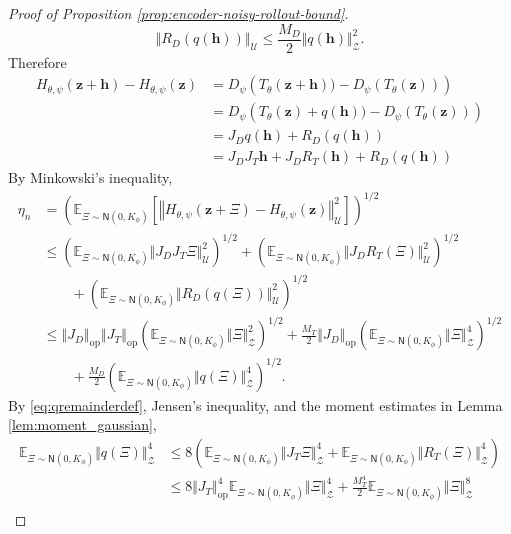 \documentclass[11pt]{article}
\newcommand{\bbE}{\mathbb{E}}
\begin{document}
\begin{proof}[Proof of Proposition \ref{prop:encoder-noisy-rollout-bound}]
\begin{equation*}
    \Vert R_D(q(\mathbf h))\Vert_\mathcal{U}\leq\frac{M_D}{2}\Vert q(\mathbf h)\Vert_\mathcal{Z}^2.
\end{equation*}
Therefore
\begin{equation*}
\begin{aligned}
    H_{\theta,\psi}(\mathbf{z}+\mathbf{h})-H_{\theta,\psi}(\mathbf z)&=D_\psi\left(T_\theta(\mathbf{z}+\mathbf h))-D_\psi(T_\theta(\mathbf z))\right)\\
    &=D_\psi\left(T_\theta(\mathbf z)+q(\mathbf{h}))-D_\psi(T_\theta(\mathbf z))\right)\\
    &=J_Dq(\mathbf h)+R_D(q(\mathbf h))\\
    &=J_DJ_T\mathbf{h}+J_DR_T(\mathbf{h})+R_D(q(\mathbf h))
\end{aligned}
\end{equation*}
By Minkowski's inequality,
\begin{align*}
    \eta_n&=\left(\bbE_{\Xi\sim\mathsf N(0,K_\phi)}\left[\left\Vert H_{\theta,\psi}(\mathbf z+\Xi)-H_{\theta,\psi}(\mathbf z)\right\Vert_\mathcal{U}^2\right]\right)^{1/2}\\
    &\leq \left(\bbE_{\Xi\sim\mathsf N(0,K_\phi)}\Vert J_DJ_T\Xi\Vert_\mathcal{U}^2\right)^{1/2}+\left(\bbE_{\Xi\sim\mathsf N(0,K_\phi)}\Vert J_DR_T(\Xi)\Vert_\mathcal{U}^2\right)^{1/2}\\
    &\qquad+\left(\bbE_{\Xi\sim\mathsf N(0,K_\phi)}\Vert R_D(q(\Xi))\Vert_\mathcal{U}^2\right)^{1/2}\\
    &\leq\left\Vert J_D\right\Vert_\mathrm{op}\left\Vert J_T\right\Vert_\mathrm{op}\left(\bbE_{\Xi\sim\mathsf N(0,K_\phi)}\Vert\Xi\Vert_\mathcal{Z}^2\right)^{1/2}+\frac{M_T}{2}\left\Vert J_D\right\Vert_\mathrm{op}\left(\bbE_{\Xi\sim\mathsf N(0,K_\phi)}\Vert\Xi\Vert_\mathcal{Z}^4\right)^{1/2}\\
    &\qquad+\frac{M_D}{2}\left(\bbE_{\Xi\sim\mathsf N(0,K_\phi)}\Vert q(\Xi)\Vert_\mathcal{Z}^4\right)^{1/2}.
\end{align*}
By \eqref{eq:qremainderdef}, Jensen's inequality, and the moment estimates in Lemma \ref{lem:moment_gaussian},
\begin{align*}
    \bbE_{\Xi\sim\mathsf N(0,K_\phi)}\Vert q(\Xi)\Vert_\mathcal{Z}^4&\leq 8\left(\bbE_{\Xi\sim\mathsf N(0,K_\phi)}\Vert J_T\Xi\Vert_\mathcal{Z}^4+\bbE_{\Xi\sim\mathsf N(0,K_\phi)}\Vert R_T(\Xi)\Vert_\mathcal{Z}^4\right)\\
    &\leq 8\Vert J_T\Vert_\mathrm{op}^4\bbE_{\Xi\sim\mathsf N(0,K_\phi)}\Vert \Xi\Vert_\mathcal{Z}^4+\frac{M_T^4}{2}\bbE_{\Xi\sim\mathsf N(0,K_\phi)}\Vert \Xi\Vert_\mathcal{Z}^8\\

\end{align*}
\end{proof}
\end{document}
